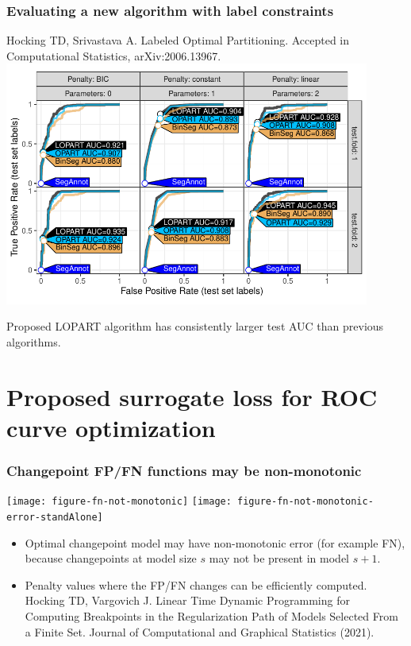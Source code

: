 \documentclass[t]{beamer}
\begin{document}
\begin{frame}
  \frametitle{Evaluating a new algorithm with label constraints}
  {\scriptsize Hocking TD, Srivastava A. Labeled Optimal Partitioning. Accepted in Computational Statistics, arXiv:2006.13967.}
  \includegraphics[width=0.9\textwidth]{figure-LOPART-roc}

  Proposed LOPART algorithm has consistently larger test AUC than
  previous algorithms.
\end{frame}

\section{Proposed surrogate loss for ROC curve optimization}

\begin{frame}
  \frametitle{Changepoint FP/FN functions may be non-monotonic}

  \texttt{[image: figure-fn-not-monotonic]}
  \texttt{[image: figure-fn-not-monotonic-error-standAlone]}

\begin{itemize}
\item Optimal changepoint model may have non-monotonic error (for example
  FN), because changepoints at model size $s$ may not be present in
  model $s+1$.
\item Penalty values where the FP/FN changes can be efficiently
  computed. Hocking TD, Vargovich J. Linear Time Dynamic Programming
  for Computing Breakpoints in the Regularization Path of Models
  Selected From a Finite Set. Journal of Computational and Graphical
  Statistics (2021).
\end{itemize}
\end{frame}
\end{document}

